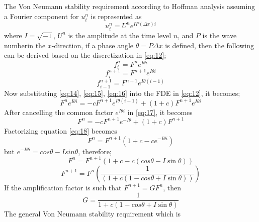 The Von Neumann stability requirement according to Hoffman \cite{Hoffmann} analysis assuming a Fourier component for $u^n_{i}$ is represented as
\begin{equation}
u^n_{i} = U^ne^{IP(\Delta x)i}
\end{equation}
where $I=\sqrt{-1}$, $U^n$ is the amplitude at the time level $n$, and $P$ is the wave numberin the $x$-direction, if a phase angle $\theta = P\Delta x$ is defined, then the following can be derived based on the discretization in \eqref{eq:12};
\begin{equation}
f^n_{i} = F^ne^{I\theta i} \label{eq:14}
\end{equation}
\begin{equation}
f^{n+1}_{i} = F^{n+1}e^{I\theta i} \label{eq:15}
\end{equation}
\begin{equation}
f^{n+1}_{i-1} = F^{n+1}e^{I\theta (i-1)} \label{eq:16}
\end{equation}
Now substituting \eqref{eq:14}, \eqref{eq:15}, \eqref{eq:16} into the FDE in \eqref{eq:12}, it becomes;
\begin{equation}
 F^{n}e^{I\theta i} = -cF^{n+1}e^{I\theta (i-1)} + (1 + c)F^{n+1}e^{I\theta i} \label{eq:17}
\end{equation}
After cancelling the common factor $e^{I\theta i}$ in \eqref{eq:17}, it becomes
\begin{equation}
F^{n} = -cF^{n+1}e^{-I\theta} + (1 + c)F^{n+1} \label{eq:18}
\end{equation}
Factorizing equation \eqref{eq:18} becomes
\begin{equation}
F^{n} = F^{n+1}(1 + c - ce^{-I\theta i}) \label{eq:19}
\end{equation}
but $e^{-I\theta i} = cos \theta - Isin \theta $, therefore;
\begin{equation*}
F^{n} = F^{n+1}\left(1 + c - c(cos \theta - I\sin \theta) \right)
\end{equation*}
\begin{equation*}
F^{n+1} = F^{n}\left(\frac{1}{\left(1 + c(1 - cos \theta + I\sin \theta) \right)} \right)
\end{equation*}
If the amplification factor is such that $ F^{n+1} = GF^{n} $, then
\begin{equation}
G = \frac{1}{1 + c(1 - cos \theta + I\sin \theta)} \label{eq:20}
\end{equation}
The general Von Neumann stability requirement which is

